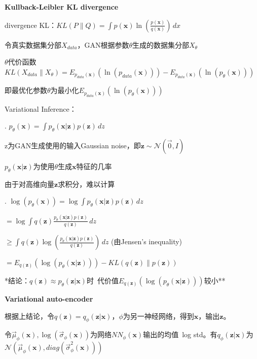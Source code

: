 \documentclass[UTF8]{ctexart}
\begin{document}
  \textbf{Kullback-Leibler KL divergence}

  \quad divergence KL：$KL(P \| Q) = \int p(\mathbf{x})\ln(\frac{p(\mathbf{x})}{q(\mathbf{x})}) \,dx $

  \quad 令真实数据集分部$X_{data}$，GAN根据参数$\theta$生成的数据集分部$X_{\theta}$
  
  \quad $\theta$代价函数$KL(X_{data} \| X_{\theta}) = E_{p_{data}(\mathbf{x})}(\ln(p_{data}(\mathbf{x}))) - E_{p_{data}(\mathbf{x})}(\ln(p_{\theta}(\mathbf{x})))$

  \quad \quad 即最优化参数$\theta$为最小化$E_{p_{data}(\mathbf{x})}(\ln(p_{\theta}(\mathbf{x})))$

  \quad Variational Inference：

  \quad {}. $p_{\theta}(\mathbf{x}) = \int p_{\theta}(\mathbf{x} | \mathbf{z})p(\mathbf{z}) \,dz $

  \quad \quad \quad z为GAN生成使用的输入Gaussian noise，即$\mathbf{z} \sim \mathcal{N}(\vec{0}, I)$

  \quad \quad \quad $p_{\theta}(\mathbf{x} | \mathbf{z})$为使用$\theta$生成$\mathbf{x}$特征的几率

  \quad \quad \quad 由于对高维向量$\mathbf{z}$求积分，难以计算

  \quad {}. $\log(p_{\theta}(\mathbf{x})) = \log\int p_{\theta}(\mathbf{x} | \mathbf{z})p(\mathbf{z}) \,dz $

  \quad \quad \quad $ = \log\int q(\mathbf{z})\frac{p_{\theta}(\mathbf{x} | \mathbf{z})p(\mathbf{z})}{q(\mathbf{z})} \,dz $

  \quad \quad \quad $ \geq \int q(\mathbf{z})\log(\frac{p_{\theta}(\mathbf{x} | \mathbf{z})p(\mathbf{z})}{q(\mathbf{z})}) \,dz $ (由Jensen's inequality)

  \quad \quad \quad $ = E_{q(\mathbf{z})}(\log(p_{\theta}(\mathbf{x} | \mathbf{z}))) - KL(q(\mathbf{z})\|p(\mathbf{z})) $

  \quad \quad **结论：$q(\mathbf{z}) \approx p_{\theta}(\mathbf{z} | \mathbf{x})$时\ 代价值$E_{q(\mathbf{z})}(\log(p_{\theta}(\mathbf{x} | \mathbf{z})))$较小**

  \textbf{Variational auto-encoder}

  \quad 根据上结论，令$q(\mathbf{z}) = q_{\phi}(\mathbf{z} | \mathbf{x})$，$\phi$为另一神经网络，得到$\mathbf{x}$，输出$\mathbf{z}$。

  \quad 令$\vec{\mu}_{\phi}(\mathbf{x}), \log(\vec{\sigma}_{\phi}(\mathbf{x}))$为网络$NN_{\phi}(\mathbf{x})$输出的均值\ log std。有$q_{\phi}(\mathbf{z} | \mathbf{x})$为$\mathcal{N}(\vec{\mu}_{\phi}(\mathbf{x}), diag(\vec{\sigma}^2_{\phi}(\mathbf{x})))$
\end{document}
